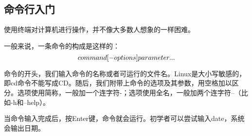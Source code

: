 \subsection{命令行入门}
使用终端对计算机进行操作，并不像大多数人想象的一样困难。

一般来说，一条命令的构成是这样的：
\begin{equation}
command \space [-options]  \space parameter...
\end{equation}

命令的开头，我们输入命令的名称或者可运行的文件名。Linux是大小写敏感的，即cd命令不能写成CD。随后，我们附带上命令的选项及其参数，用空格加以区分。选项使用简称，一般加一个连字符-；选项使用全名，一般加两个连字符--（比如-h和--help）。

当命令输入完成后，按Enter键，命令就会运行。初学者可以尝试输入date，系统会输出日期。


